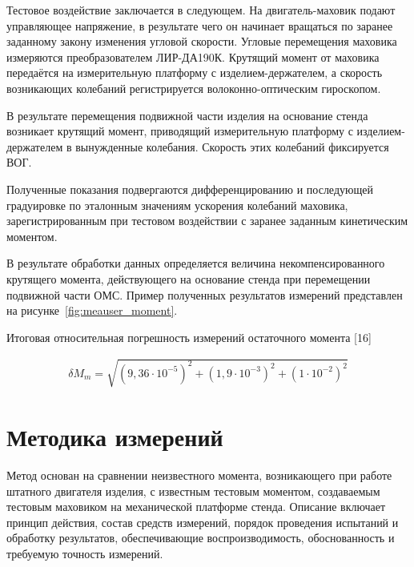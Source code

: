 Тестовое воздействие заключается в следующем. На двигатель-маховик подают управляющее напряжение, в результате чего он начинает вращаться по заранее заданному закону изменения угловой скорости. Угловые перемещения маховика измеряются преобразователем ЛИР-ДА190К. Крутящий момент от маховика передаётся на измерительную платформу с изделием-держателем, а скорость возникающих колебаний регистрируется волоконно-оптическим гироскопом.

В результате перемещения подвижной части изделия на основание стенда возникает крутящий момент, приводящий измерительную платформу с изделием-держателем в вынужденные колебания. Скорость этих колебаний фиксируется ВОГ.

Полученные показания подвергаются дифференцированию и последующей градуировке по эталонным значениям ускорения колебаний маховика, зарегистрированным при тестовом воздействии с заранее заданным кинетическим моментом.

В результате обработки данных определяется величина некомпенсированного крутящего момента, действующего на основание стенда при перемещении подвижной части ОМС. Пример полученных результатов измерений представлен на рисунке~\cref{fig:meauser_moment}.




Итоговая относительная погрешность измерений остаточного момента [16]

\begin{samepage}
	\begin{equation}
		\label{eq:final_moment_err}
		\begin{alignedat}{2}
			\delta M_m = \sqrt{(9,36 \cdot 10^{-5})^2+(1,9 \cdot 10^{-3})^2+(1\cdot 10^{-2})^2}
		\end{alignedat}
	\end{equation}
\end{samepage}

\section{Методика измерений}\label{sec:ch4/sect3}

Метод основан на сравнении неизвестного момента, возникающего при работе штатного двигателя изделия, с известным тестовым моментом, создаваемым тестовым маховиком на механической платформе стенда. Описание включает принцип действия, состав средств измерений, порядок проведения испытаний и обработку результатов, обеспечивающие воспроизводимость, обоснованность и требуемую точность измерений.

